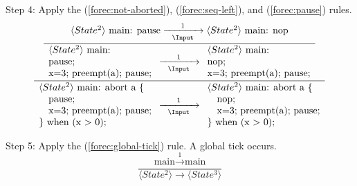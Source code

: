 \noindent
Step 4: Apply the (\ref{forec:not-aborted}), (\ref{forec:seq-left}), 
and (\ref{forec:pause}) rules. 
\begin{equation*}
	\frac{
		\dfrac{
				\langle State^2 \rangle ~ \text{main: pause}
					\xrightarrow[~~\Input~~]{1}
				 \langle State^2 \rangle ~ \text{main: nop}
			}{
				\begin{array}{l}
					\langle State^2 \rangle ~ \text{main:}	\\
					\text{pause;}							\\
					\text{x=3; preempt(a); pause;}							
				\end{array}
					\xrightarrow[~~\Input~~]{1} 
				\begin{array}{l}
					\langle State^2 \rangle ~ \text{main:}	\\
					\text{nop;}								\\
					\text{x=3; preempt(a); pause;}							
				\end{array}
			}
		}{
			\begin{array}{l}
				\langle State^2 \rangle ~ \text{main: abort a \{}	\\
				\text{~~~pause;}									\\
				\text{~~~x=3; preempt(a); pause;}					\\
				\text{\} when (x > 0);}
			\end{array}
				\xrightarrow[~~\Input~~]{1} 
			\begin{array}{l}
				\langle State^2 \rangle ~ \text{main: abort a \{}	\\
				\text{~~~nop;}										\\
				\text{~~~x=3; preempt(a); pause;}					\\
				\text{\} when (x > 0);}
			\end{array}
		}
\end{equation*}

\noindent
Step 5: Apply the (\ref{forec:global-tick}) rule.
A global tick occurs.
\begin{equation*}
	\frac{
			\text{main} \xrightarrow{~~1~~} \text{main}
		}{
			\langle State^2 \rangle \xrightarrow{~~~~~} \langle State^3 \rangle
		}
\end{equation*}

